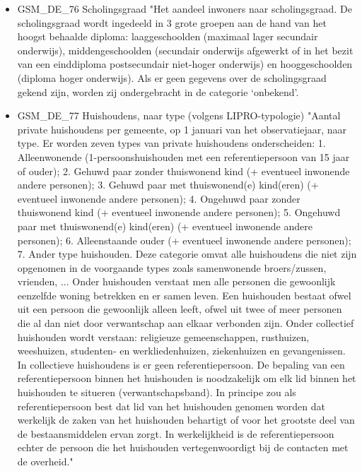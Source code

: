 \documentclass{SVnote}
\begin{document}
\begin{itemize}
\item GSM\_DE\_76	Scholingsgraad		"Het aandeel inwoners naar scholingsgraad. De scholingsgraad wordt ingedeeld in 3 grote groepen aan de hand van het hoogst behaalde diploma: laaggeschoolden (maximaal lager secundair onderwijs), middengeschoolden (secundair onderwijs afgewerkt of in het bezit van een einddiploma postsecundair niet-hoger onderwijs) en hooggeschoolden (diploma hoger onderwijs). Als er geen gegevens over de scholingsgraad gekend zijn, worden zij ondergebracht in de categorie ‘onbekend’.
\item GSM\_DE\_77	Huishoudens, naar type (volgens LIPRO-typologie)		"Aantal private huishoudens per gemeente, op 1 januari van het observatiejaar, naar type. Er worden zeven types van private huishoudens onderscheiden:
1. Alleenwonende (1-persoonshuishouden met een referentiepersoon van 15 jaar of ouder);
2. Gehuwd paar zonder thuiswonend kind (+ eventueel inwonende andere personen);
3. Gehuwd paar met thuiswonend(e) kind(eren) (+ eventueel inwonende andere personen);
4. Ongehuwd paar zonder thuiswonend kind (+ eventueel inwonende andere personen);
5. Ongehuwd paar met thuiswonend(e) kind(eren) (+ eventueel inwonende andere personen);
6. Alleenstaande ouder (+ eventueel inwonende andere personen);
7. Ander type huishouden. Deze categorie omvat alle huishoudens die niet zijn opgenomen in de voorgaande types zoals samenwonende broers/zussen, vrienden, ...
Onder huishouden verstaat men alle personen die gewoonlijk eenzelfde woning betrekken en er samen leven. Een huishouden bestaat ofwel uit een persoon die gewoonlijk alleen leeft, ofwel uit twee of meer personen die al dan niet door verwantschap aan elkaar verbonden zijn. Onder collectief huishouden wordt verstaan: religieuze gemeenschappen, rusthuizen, weeshuizen, studenten- en werkliedenhuizen, ziekenhuizen en gevangenissen. In collectieve huishoudens is er geen referentiepersoon.
De bepaling van een referentiepersoon binnen het huishouden is noodzakelijk om elk lid binnen het huishouden te situeren (verwantschapsband). In principe zou als referentiepersoon best dat lid van het huishouden genomen worden dat werkelijk de zaken van het huishouden behartigt of voor het grootste deel van de bestaansmiddelen ervan zorgt. In werkelijkheid is de referentiepersoon echter de persoon die het huishouden vertegenwoordigt bij de contacten met de overheid."
\end{itemize}
\end{document}
